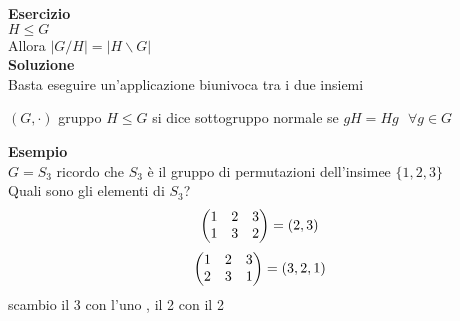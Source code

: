 \documentclass[12px]{article}
\begin{document}
 \textbf{Esercizio}\\
 $H\leq G$\\
 Allora  $|G/H| = |H\backslash G|$ \\
 \textbf{Soluzione}\\
 Basta eseguire un'applicazione biunivoca tra i due insiemi
 \begin{defi}
 	$(G,\cdot)$ gruppo $H\leq G$ si dice sottogruppo normale se  $gH = Hg \ \ \ \forall g\in G$
 \end{defi}
 \textbf{Esempio}\\
 $G=S_3$ ricordo che  $S_3$ è il gruppo di permutazioni dell'insimee $\lbrace 1,2,3\rbrace$\\
 Quali sono gli elementi di  $S_3$?\\
 \[
	 \begin{pmatrix}1&2&3\\1&3&2\end{pmatrix} = (2,3)
 \] 
 \[
	 \begin{pmatrix}1&2&3\\2&3&1\end{pmatrix} = (3,2,1)
 \] 
scambio il 3 con l'uno , il 2 con il 2\\
\end{document}
